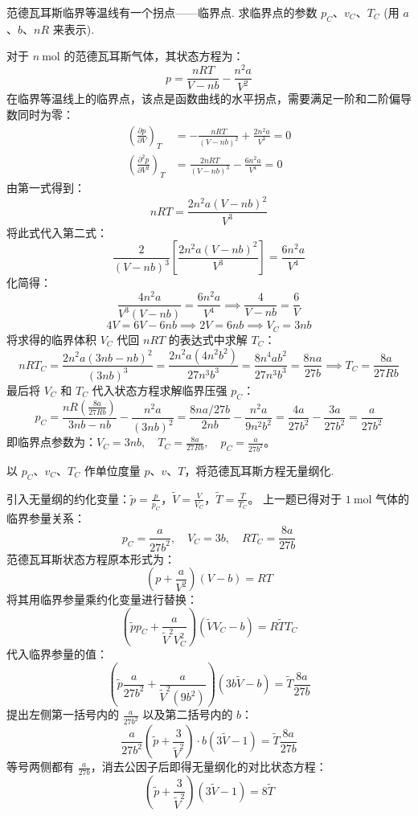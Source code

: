 \begin{exercise}\label{ex:14.2}
范德瓦耳斯临界等温线有一个拐点——临界点. 求临界点的参数 $p_C$、$v_C$、$T_C$ (用 $a$、$b$、$nR$ 来表示).
\end{exercise}
\begin{solution}
对于 $n \ \mathrm{mol}$ 的范德瓦耳斯气体，其状态方程为：
$$ p = \frac{nRT}{V - nb} - \frac{n^2 a}{V^2} $$
在临界等温线上的临界点，该点是函数曲线的水平拐点，需要满足一阶和二阶偏导数同时为零：
\begin{align}
    \left( \frac{\partial p}{\partial V} \right)_T &= - \frac{nRT}{(V - nb)^2} + \frac{2n^2 a}{V^3} = 0 \\
    \left( \frac{\partial^2 p}{\partial V^2} \right)_T &= \frac{2nRT}{(V - nb)^3} - \frac{6n^2 a}{V^4} = 0
\end{align}
由第一式得到：
$$ nRT = \frac{2n^2 a (V - nb)^2}{V^3} $$
将此式代入第二式：
$$ \frac{2}{(V - nb)^3} \left[ \frac{2n^2 a (V - nb)^2}{V^3} \right] = \frac{6n^2 a}{V^4} $$
化简得：
$$ \frac{4 n^2 a}{V^3 (V - nb)} = \frac{6 n^2 a}{V^4} \implies \frac{4}{V - nb} = \frac{6}{V} $$
$$ 4V = 6V - 6nb \implies 2V = 6nb \implies V_C = 3nb $$
将求得的临界体积 $V_C$ 代回 $nRT$ 的表达式中求解 $T_C$：
$$ nRT_C = \frac{2n^2 a (3nb - nb)^2}{(3nb)^3} = \frac{2n^2 a (4n^2 b^2)}{27n^3 b^3} = \frac{8n^4 a b^2}{27n^3 b^3} = \frac{8na}{27b} \implies T_C = \frac{8a}{27Rb} $$
最后将 $V_C$ 和 $T_C$ 代入状态方程求解临界压强 $p_C$：
$$ p_C = \frac{nR \left( \frac{8a}{27Rb} \right)}{3nb - nb} - \frac{n^2 a}{(3nb)^2} = \frac{8na/27b}{2nb} - \frac{n^2 a}{9n^2 b^2} = \frac{4a}{27b^2} - \frac{3a}{27b^2} = \frac{a}{27b^2} $$
即临界点参数为：$V_C = 3nb, \quad T_C = \frac{8a}{27Rb}, \quad p_C = \frac{a}{27b^2}$。
\end{solution}

\begin{exercise}\label{ex:14.3}
以 $p_C$、$v_C$、$T_C$ 作单位度量 $p$、$v$、$T$，将范德瓦耳斯方程无量纲化.
\end{exercise}
\begin{solution}
引入无量纲的约化变量：$\tilde{p} = \frac{p}{p_C}$，$\tilde{V} = \frac{V}{V_C}$，$\tilde{T} = \frac{T}{T_C}$。
上一题已得对于 $1 \ \mathrm{mol}$ 气体的临界参量关系：
$$ p_C = \frac{a}{27b^2}, \quad V_C = 3b, \quad RT_C = \frac{8a}{27b} $$
范德瓦耳斯状态方程原本形式为：
$$ \left( p + \frac{a}{V^2} \right)(V - b) = RT $$
将其用临界参量乘约化变量进行替换：
$$ \left( \tilde{p} p_C + \frac{a}{\tilde{V}^2 V_C^2} \right)(\tilde{V} V_C - b) = R \tilde{T} T_C $$
代入临界参量的值：
$$ \left( \tilde{p} \frac{a}{27b^2} + \frac{a}{\tilde{V}^2 (9b^2)} \right)(3b\tilde{V} - b) = \tilde{T} \frac{8a}{27b} $$
提出左侧第一括号内的 $\frac{a}{27b^2}$ 以及第二括号内的 $b$：
$$ \frac{a}{27b^2} \left( \tilde{p} + \frac{3}{\tilde{V}^2} \right) \cdot b(3\tilde{V} - 1) = \tilde{T} \frac{8a}{27b} $$
等号两侧都有 $\frac{a}{27b}$，消去公因子后即得无量纲化的对比状态方程：
$$ \left( \tilde{p} + \frac{3}{\tilde{V}^2} \right) (3\tilde{V} - 1) = 8\tilde{T} $$
\end{solution}

